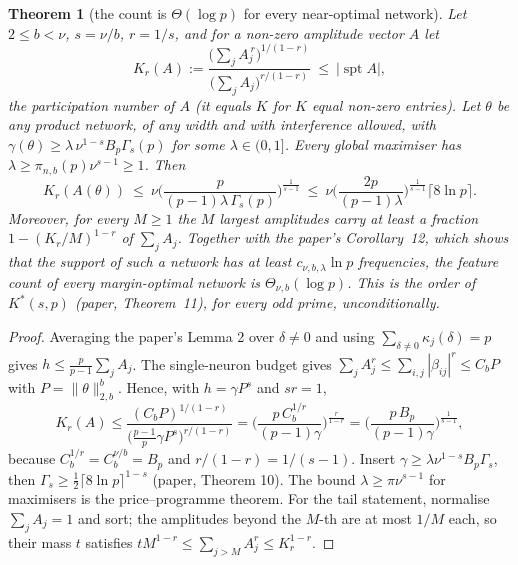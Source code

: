 \documentclass[11pt]{article}
\newtheorem{theorem}{Theorem}
\theoremstyle{definition}
\begin{document}
\begin{theorem}[the count is $\Theta(\log p)$ for every near-optimal network]\label{thm:theta}
Let $2\le b<\nu$, $s=\nu/b$, $r=1/s$, and for a non-zero amplitude vector $A$ let
\[K_r(A):=\frac{\big(\sum_jA_j^{\,r}\big)^{1/(1-r)}}{\big(\sum_jA_j\big)^{r/(1-r)}}\ \le\ |\operatorname{spt}A| ,\]
the participation number of $A$ (it equals $K$ for $K$ equal non-zero entries).  Let $\theta$ be any product network,
of any width and with interference allowed, with $\gamma(\theta)\ge\lambda\,\nu^{1-s}B_p\Gamma_s(p)$ for some $\lambda\in(0,1]$.
Every global maximiser has $\lambda\ge\pi_{n,b}(p)\nu^{s-1}\ge1$.  Then
\[K_r(A(\theta))\ \le\ \nu\Big(\frac{p}{(p-1)\lambda\,\Gamma_s(p)}\Big)^{\frac1{s-1}}\ \le\ \nu\Big(\frac{2p}{(p-1)\lambda}\Big)^{\frac1{s-1}}\lceil8\ln p\rceil .\]
Moreover, for every $M\ge1$ the $M$ largest amplitudes carry at least a fraction $1-(K_r/M)^{1-r}$ of $\sum_jA_j$.
Together with the paper's Corollary~12, which shows that the support of such a network has at least $c_{\nu,b,\lambda}\ln p$
frequencies, the feature count of every margin-optimal network is $\Theta_{\nu,b}(\log p)$.  This is the order of
$K^*(s,p)$ (paper, Theorem~11), for every odd prime, unconditionally.
\end{theorem}
\begin{proof}
Averaging the paper's Lemma 2 over $\delta\ne0$ and using $\sum_{\delta\ne0}\kappa_j(\delta)=p$ gives
$h\le\frac{p}{p-1}\sum_jA_j$.  The single-neuron budget gives $\sum_jA_j^r\le\sum_{i,j}|\beta_{ij}|^r\le C_bP$ with
$P=\|\theta\|_{2,b}^b$.  Hence, with $h=\gamma P^s$ and $sr=1$,
\[K_r(A)\le\frac{(C_bP)^{1/(1-r)}}{\big(\frac{p-1}p\gamma P^s\big)^{r/(1-r)}}
=\Big(\frac{p\,C_b^{1/r}}{(p-1)\gamma}\Big)^{\frac r{1-r}}=\Big(\frac{p\,B_p}{(p-1)\gamma}\Big)^{\frac1{s-1}},\]
because $C_b^{1/r}=C_b^{\nu/b}=B_p$ and $r/(1-r)=1/(s-1)$.  Insert $\gamma\ge\lambda\nu^{1-s}B_p\Gamma_s$, then
$\Gamma_s\ge\frac12\lceil8\ln p\rceil^{1-s}$ (paper, Theorem 10).  The bound $\lambda\ge\pi\nu^{s-1}$ for maximisers is the
price--programme theorem.  For the tail statement, normalise $\sum_jA_j=1$ and sort; the amplitudes beyond the $M$-th are at
most $1/M$ each, so their mass $t$ satisfies $tM^{1-r}\le\sum_{j>M}A_j^r\le K_r^{1-r}$.
\end{proof}
\end{document}

